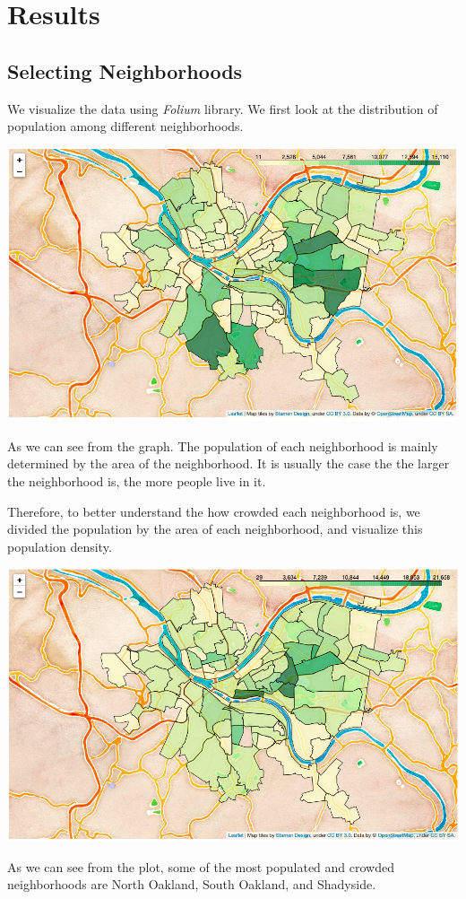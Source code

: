 \documentclass[11pt,notitlepage]{article}
\begin{document}
\section{Results}
\subsection{Selecting Neighborhoods}
We visualize the data using \textit{Folium} library.
We first look at the distribution of population among
different neighborhoods.
\begin{center}
    \includegraphics[scale=0.35]{popu.png}
\end{center}
As we can see from the graph.
The population of each neighborhood is mainly determined
by the area of the neighborhood.
It is usually the case the the larger the neighborhood is,
the more people live in it.

Therefore, to better understand the how crowded each neighborhood is,
we divided the population by the area of each neighborhood,
and visualize this population density.
\begin{center}
    \includegraphics[scale=0.35]{popu_den.png}
\end{center}
As we can see from the plot, some of the most populated and crowded neighborhoods
are North Oakland, South Oakland, and Shadyside.
\end{document}
